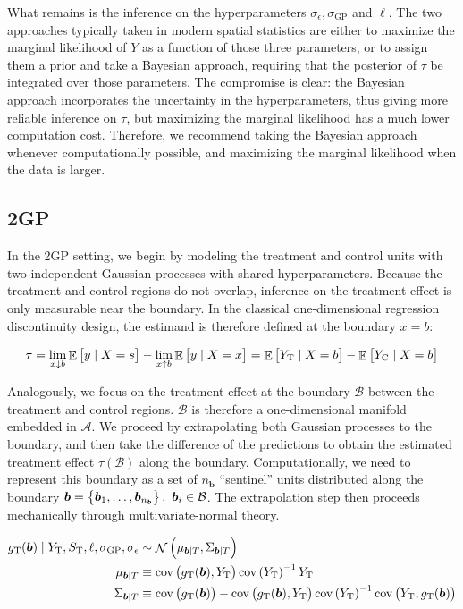 \documentclass[letter]{article}
\DeclareMathOperator{\E}{\mathbb{E}}
\DeclareMathOperator{\cov}{{cov}}
\DeclareMathOperator{\normal}{\mathcal{N}}
\newcommand{\area}{\mathcal{A}}
\newcommand{\treat}{\mathrm{T}}
\newcommand{\ctrol}{\mathrm{C}}
\newcommand{\sigmaf}{\sigma_{\mathrm{GP}}}
\newcommand{\sigman}{\sigma_{\epsilon}}
\newcommand{\boundary}{\mathcal{B}}
\newcommand{\sentinels}{\bm{b}}
\newcommand{\numsent}{n_{\sentinels}}
\begin{document}
What remains is the inference on the hyperparameters \(\sigman, \sigmaf\) and \(\ell\). The two approaches typically taken in modern spatial statistics are either to maximize the marginal likelihood of \(Y\) as a function of those three parameters, or to assign them a prior and take a Bayesian approach, requiring that the posterior of \(\tau\) be integrated over those parameters. The compromise is clear: the Bayesian approach incorporates the uncertainty in the hyperparameters, thus giving more reliable inference on \(\tau\), but maximizing the marginal likelihood has a much lower computation cost. Therefore, we recommend taking the Bayesian approach whenever computationally possible, and maximizing the marginal likelihood when the data is larger.
    


    	\subsection{2GP}\label{gp}

In the 2GP setting, we begin by modeling the treatment and control units with two independent Gaussian processes with shared hyperparameters. Because the treatment and control regions do not overlap, inference on the treatment effect is only measurable near the boundary. In the classical one-dimensional regression discontinuity design, the estimand is therefore defined at the boundary \(x=b\):

\begin{equation}
\tau = \lim_{x \downarrow b} \E\sbr{y \mid X=s} - \lim_{x \uparrow b} \E\sbr{y \mid X=x} = \E\sbr{Y_\treat{} \mid X=b} - \E\sbr{Y_\ctrol{} \mid X=b}
\end{equation}

Analogously, we focus on the treatment effect at the boundary \(\boundary\) between the treatment and control regions. \(\boundary\) is therefore a one-dimensional manifold embedded in \(\area\).
We proceed by extrapolating both Gaussian processes to the boundary,
and then take the difference of the predictions to obtain the estimated treatment effect \(\tau(\boundary)\) along the boundary.
Computationally, we need to represent this boundary as a set of \(\numsent\) ``sentinel'' units distributed along the boundary \(\sentinels=\cbr{\sentinels_1,\ldots,\sentinels_{\numsent}},~\sentinels_i \in \boundary\).
The extrapolation step then proceeds mechanically through multivariate-normal theory.

\begin{equation}\begin{split}
    g_\treat{}(\sentinels) \mid Y_\treat{}, S_\treat{}, \ell, \sigmaf, \sigman &\sim \normal\del{\mu_{\sentinels \mid T}, \Sigma_{\sentinels \mid T}} \\
    \mu_{\sentinels \mid T} &\equiv \cov\del{g_\treat{}(\sentinels), Y_\treat{}} \cov\del{Y_\treat{}}^{-1}  Y_\treat{} \\
    \Sigma_{\sentinels \mid T} &\equiv \cov \del{g_\treat{}(\sentinels)} - \cov\del{g_\treat{}(\sentinels), Y_\treat{}} \cov\del{Y_\treat{}}^{-1} \cov\del{Y_\treat{},g_\treat{}(\sentinels) \label{eq:postvar2gp}
    }
\end{split}\end{equation}
\end{document}
